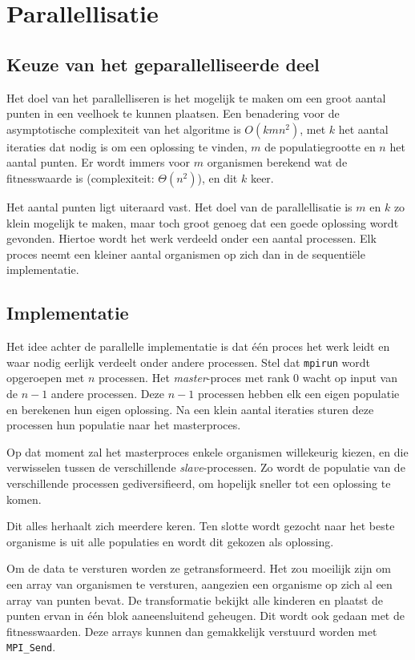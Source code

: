 \documentclass[titlepage,a4paper]{article}
\begin{document}
\section{Parallellisatie}
\label{sec:mpi}
\subsection{Keuze van het geparallelliseerde deel}
Het doel van het parallelliseren is het mogelijk te maken om een groot aantal punten in een veelhoek te kunnen plaatsen. Een benadering voor de asymptotische complexiteit van het algoritme is $O(kmn^2)$, met $k$ het aantal iteraties dat nodig is om een oplossing te vinden, $m$ de populatiegrootte en $n$ het aantal punten. Er wordt immers voor $m$ organismen berekend wat de fitnesswaarde is (complexiteit: $\Theta(n^2)$), en dit $k$ keer.

Het aantal punten ligt uiteraard vast. Het doel van de parallellisatie is $m$ en $k$ zo klein mogelijk te maken, maar toch groot genoeg dat een goede oplossing wordt gevonden. Hiertoe wordt het werk verdeeld onder een aantal processen. Elk proces neemt een kleiner aantal organismen op zich dan in de sequenti\"ele implementatie.

\subsection{Implementatie}
Het idee achter de parallelle implementatie is dat \'e\'en proces het werk leidt en waar nodig eerlijk verdeelt onder andere processen. Stel dat \texttt{mpirun} wordt opgeroepen met $n$ processen. Het \textit{master}-proces met rank 0 wacht op input van de $n-1$ andere processen. Deze $n-1$ processen hebben elk een eigen populatie en berekenen hun eigen oplossing. Na een klein aantal iteraties sturen deze processen hun populatie naar het masterproces.

Op dat moment zal het masterproces enkele organismen willekeurig kiezen, en die verwisselen tussen de verschillende \textit{slave}-processen. Zo wordt de populatie van de verschillende processen gediversifieerd, om hopelijk sneller tot een oplossing te komen.

Dit alles herhaalt zich meerdere keren. Ten slotte wordt gezocht naar het beste organisme is uit alle populaties en wordt dit gekozen als oplossing. 

Om de data te versturen worden ze getransformeerd. Het zou moeilijk zijn om een array van organismen te versturen, aangezien een organisme op zich al een array van punten bevat. De transformatie bekijkt alle kinderen en plaatst de punten ervan in \'e\'en blok aaneensluitend geheugen. Dit wordt ook gedaan met de fitnesswaarden. Deze arrays kunnen dan gemakkelijk verstuurd worden met \texttt{MPI\_Send}.
\end{document}
